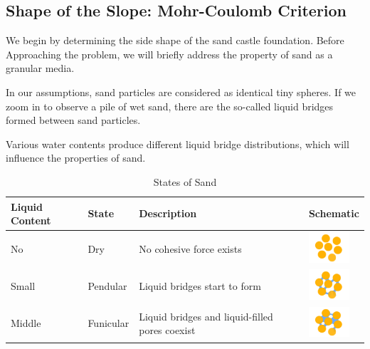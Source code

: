 \documentclass[12pt]{article}
\begin{document}
\subsection{Shape of the Slope: Mohr-Coulomb Criterion}
We begin by determining the side shape of the sand castle foundation. Before Approaching the problem, we will briefly address the property of sand as a granular media.
\par
In our assumptions, sand particles are considered as identical tiny spheres. If we zoom in to observe a pile of wet sand, there are the so-called liquid bridges formed between sand particles.
\par
Various water contents produce different liquid bridge distributions, which will influence the properties of sand.

\begin{table}[H]
    \caption{States of Sand}
    \vspace{10pt}
    \centering
    \begin{tabular}{p{3.5cm}p{2cm}p{6cm}p{2cm}}
        \hline
        Liquid Content   & State     & Description                                    & Schematic                  \\
        \hline
        No               & Dry       & No cohesive force exists                       & \begin{minipage}{0.5\textwidth}
            \includegraphics[width=1.5cm, height=1.125cm]{s1.png}
        \end{minipage}  \\
        Small            & Pendular  & Liquid bridges start to form                   & \begin{minipage}{0.1\textwidth}
            \includegraphics[width=1.5cm, height=1.125cm]{s2.png}
        \end{minipage} \\
        Middle           & Funicular & Liquid bridges and liquid-filled pores coexist & \begin{minipage}{0.1\textwidth}
            \includegraphics[width=1.5cm, height=1.125cm]{s3.png}

\end{minipage}
\end{tabular}
\end{table}
\end{document}

